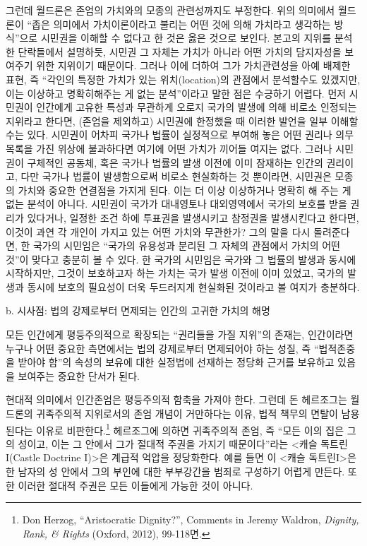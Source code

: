 그런데 월드론은 존엄의 가치와의 모종의 관련성까지도 부정한다. 위의 의미에서 월드론이 ``좁은 의미에서 가치이론이라고 불리는 어떤 것에 의해 가치라고 생각하는 방식''으로 시민권을 이해할 수 없다고 한 것은 옳은 것으로 보인다. 본고의 지위를 분석한 단락들에서 설명하듯, 시민권 그 자체는 가치가 아니라 어떤 가치의 담지자성을 보여주기 위한 지위이기 때문이다. 그러나 이에 더하여 그가 가치관련성을 아예 배제한 표현, 즉 ``각인의 특정한 가치가 있는 위치(location)의 관점에서 분석할수도 있겠지만, 이는 이상하고 명확히해주는 게 없는 분석''이라고 말한 점은 수긍하기 어렵다. 먼저 시민권이 인간에게 고유한 특성과 무관하게 오로지 국가의 발생에 의해 비로소 인정되는 지위라고 한다면, (존엄을 제외하고) 시민권에 한정했을 때 이러한 발언을 일부 이해할 수는 있다. 시민권이 어차피 국가나 법률이 실정적으로 부여해 놓은 어떤 권리나 의무목록을 가진 위상에 불과하다면 여기에 어떤 가치가 끼어들 여지는 없다. 그러나 시민권이 구체적인 공동체, 혹은 국가나 법률의 발생 이전에 이미 잠재하는 인간의 권리이고, 다만 국가나 법률이 발생함으로써 비로소 현실화하는 것 뿐이라면, 시민권은 모종의 가치와 중요한 연결점을 가지게 된다. 이는 더 이상 이상하거나 명확히 해 주는 게 없는 분석이 아니다. 시민권이 국가가 대내영토나 대외영역에서 국가의 보호를 받을 권리가 있다거나, 일정한 조건 하에 투표권을 발생시키고 참정권을 발생시킨다고 한다면, 이것이 과연 각 개인이 가지고 있는 어떤 가치와 무관한가? 그의 말을 다시 돌려준다면, 한 국가의 시민임은 ``국가의 유용성과 분리된 그 자체의 관점에서 가치의 어떤 것''이 맞다고 충분히 볼 수 있다. 한 국가의 시민임은 국가와 그 법률의 발생과 동시에 시작하지만, 그것이 보호하고자 하는 가치는 국가 발생 이전에 이미 있었고, 국가의 발생과 동시에 보호의 필요성이 더욱 두드러지게 현실화된 것이라고 볼 여지가 충분하다.

b. 시사점: 법의 강제로부터 면제되는 인간의 고귀한 가치의 해명

모든 인간에게 평등주의적으로 확장되는 ``권리들을 가질 지위''의 존재는, 인간이라면 누구나 어떤 중요한 측면에서는 법의 강제로부터 면제되어야 하는 성질, 즉 ``법적존중을 받아야 함''의 속성의 보유에 대한 실정법에 선재하는 정당화 근거를 보유하고 있음을 보여주는 중요한 단서가 된다.

현대적 의미에서 인간존엄은 평등주의적 함축을 가져야 한다. 그런데 돈 헤르조그는 월드론의 귀족주의적 지위로서의 존엄 개념이 거만하다는 이유, 법적 책무의 면탈이 남용된다는 이유로 비판한다.\footnote{Don Herzog, ``Aristocratic Dignity?'', Comments in Jeremy Waldron, \emph{Dignity, Rank, \& Rights} (Oxford, 2012), 99-118면.} 헤르조그에 의하면 귀족주의적 존엄, 즉 ``모든 이의 집은 그의 성이고, 이는 그 안에서 그가 절대적 주권을 가지기 때문이다''라는 \textless 캐슬 독트린 I(Castle Doctrine I)\textgreater 은 계급적 억압을 정당화한다. 예를 들면 이 \textless 캐슬 독트린I\textgreater 은 한 남자의 성 안에서 그의 부인에 대한 부부강간을 범죄로 구성하기 어렵게 만든다. 또한 이러한 절대적 주권은 모든 이들에게 가능한 것이 아니다.

